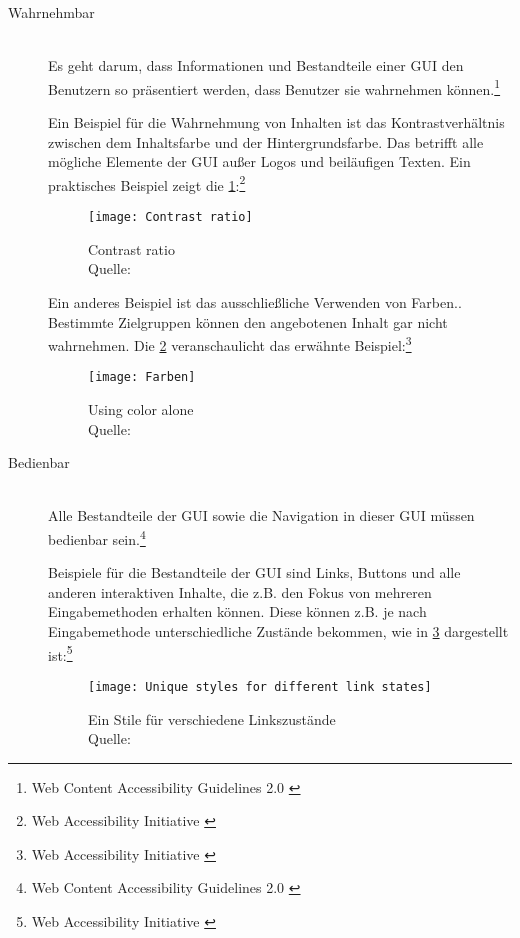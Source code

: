 \begin{description}
	\item [Wahrnehmbar]\hfill \\
	Es geht darum, dass Informationen und Bestandteile einer \ac{GUI} den Benutzern so präsentiert werden, dass Benutzer sie wahrnehmen 
	können.\footnote{Web Content Accessibility Guidelines 2.0 \cite{WCAG2.0}}
	
	Ein Beispiel für die Wahrnehmung von Inhalten ist das Kontrastverhältnis zwischen dem Inhaltsfarbe und der Hintergrundsfarbe. Das betrifft alle 
	mögliche Elemente der \ac{GUI} außer Logos und beiläufigen Texten. Ein praktisches Beispiel zeigt die \cref{fig:Contrast ratio}:\footnote{Web Accessibility 
	Initiative \cite{WAI}}
	
	\begin{figure}[H]
		\centering
		\texttt{[image: Contrast ratio]}
		\caption[Contrast ratio]{Contrast ratio \\Quelle: \cite{WAI}}
		\label{fig:Contrast ratio}
	\end{figure}
	
	Ein anderes Beispiel ist das ausschließliche Verwenden von Farben.. Bestimmte Zielgruppen können den angebotenen Inhalt gar nicht wahrnehmen. Die 
	\ref{fig:using color alone} veranschaulicht das erwähnte Beispiel:\footnote{Web Accessibility Initiative \cite{WAI}}
	
	\begin{figure}[H]
		\centering
		\texttt{[image: Farben]}
		\caption[Using color alone]{Using color alone \\Quelle: \cite{WAI}}
		\label{fig:using color alone}
	\end{figure}
	
	\item [Bedienbar]\hfill \\
	Alle Bestandteile der \ac{GUI} sowie die Navigation in dieser \ac{GUI} müssen bedienbar sein.\footnote{Web Content Accessibility Guidelines 2.0 \cite{WCAG2.0}}
	
	Beispiele für die Bestandteile der \ac{GUI} sind Links, Buttons und alle anderen interaktiven Inhalte, die z.B. den Fokus von mehreren Eingabemethoden erhalten 
	können. Diese können z.B. je nach Eingabemethode unterschiedliche Zustände bekommen, wie in \cref{fig:Ein Stile für verschiedene Linkszustände} dargestellt 
	ist:\footnote{Web Accessibility Initiative \cite{WAI}}
	
	\begin{figure}[H]
		\centering
		\texttt{[image: Unique styles for different link states]}
		\caption[Ein Stile für verschiedene Linkszustände]{Ein Stile für verschiedene Linkszustände \\Quelle: \cite{WAI}}
		\label{fig:Ein Stile für verschiedene Linkszustände}
	\end{figure}
	

\end{description}
